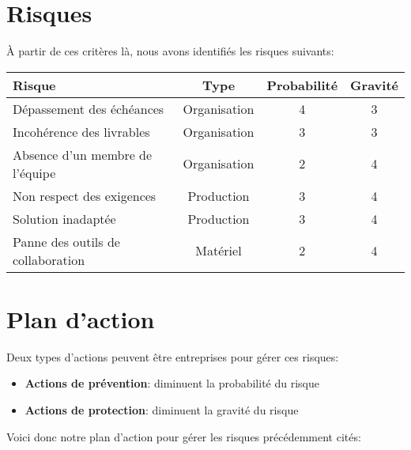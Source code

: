 \newpage

\section{Risques}
À partir de ces critères là, nous avons identifiés les risques suivants:

\begin{tabular}{|l||c|c|c|}
   \hline	
	   \textbf{Risque} & \textbf{Type} & \textbf{Probabilité} & \textbf{Gravité} \\ \hline \hline
	   Dépassement des échéances         & Organisation & 4 & 3  \\ \hline
	   Incohérence des livrables         & Organisation & 3 & 3  \\ \hline
  	 Absence d'un membre de l'équipe   & Organisation & 2 & 4  \\ \hline
	   Non respect des exigences         & Production   & 3 & 4  \\ \hline
	   Solution inadaptée                & Production   & 3 & 4  \\ \hline
	   Panne des outils de collaboration & Matériel     & 2 & 4  \\
   \hline
\end{tabular}

\section{Plan d'action}

Deux types d'actions peuvent être entreprises pour gérer ces risques:

\begin{itemize}
  \item \textbf{Actions de prévention}: diminuent la probabilité du risque
  \item \textbf{Actions de protection}: diminuent la gravité du risque
\end{itemize}

Voici donc notre plan d'action pour gérer les risques précédemment cités:

